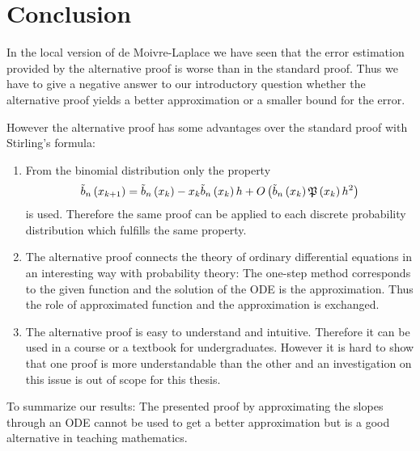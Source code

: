 \chapter{Conclusion}

In the local version of de Moivre-Laplace we have seen that the error estimation provided by the alternative proof is worse than in the standard proof. Thus we have to give a negative answer to our introductory question whether the alternative proof yields a better approximation or a smaller bound for the error.

However the alternative proof has some advantages over the standard proof with Stirling's formula:

\begin{enumerate}
  \item From the binomial distribution only the property
    \begin{align}
      \bb{\x[k+1]} = \bb{\x[k]} - \x[k]\bb{\x[k]} h + \bigo{\bb{\x[k]} \pol{\x[k]} h^2}
    \end{align}
    is used. Therefore the same proof can be applied to each discrete probability distribution which fulfills the same property.

  \item The alternative proof connects the theory of ordinary differential equations in an interesting way with probability theory: The one-step method corresponds to the given function and the solution of the ODE is the approximation. Thus the role of approximated function and the approximation is exchanged.

  \item The alternative proof is easy to understand and intuitive. Therefore it can be used in a course or a textbook for undergraduates. However it is hard to show that one proof is more understandable than the other \cite{tampis:understandability} and an investigation on this issue is out of scope for this thesis. 
\end{enumerate}

To summarize our results: The presented proof by approximating the slopes through an ODE cannot be used to get a better approximation but is a good alternative in teaching mathematics.
